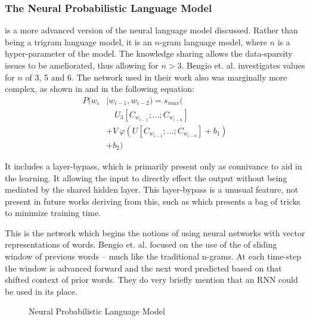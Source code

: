 \documentclass[parskip]{komatufte}
\begin{document}
\subsubsection{The Neural Probabilistic Language Model}
 is a more advanced version of the neural language model discussed.
Rather than being a trigram language model, it is an $n$-gram language model, where $n$ is a hyper-parameter of the model.
The knowledge sharing allows the data-sparsity issues to be ameliorated, thus allowing for $n>3$.
%
%
Bengio et. al. investigates values for $n$ of 3, 5 and 6.
The network used in their work also was marginally more complex, as shown in  and in the following equation:
\begin{align}
P(w_i & \mid w_{i-1}, w_{i-2}) = s_{max}( \nonumber
\\  & \quad U_3 \left[ C_{w_{i-1}};...; C_{w_{i-n}}\right] \nonumber
\\  & + V \: \varphi\left( U\left[C_{w_{i-1}};...; C_{w_{i-n}} \right] + b_1\right) \nonumber
\\  & +b_2)
\end{align}

It includes a layer-bypass, which is primarily present only as connivance to aid in the learning.
It allowing the input to directly effect the output without being mediated by the shared hidden layer.
This layer-bypass is a unusual feature, not present in future works deriving from this, such as  which presents a bag of tricks to minimize training time. 


This is the network which begins the notions of using neural networks with vector representations of words.
Bengio et. al. focused on the use of the of sliding window of previous words -- much like the traditional n-grams.
At each time-step the window is advanced forward and the next word predicted based on that shifted context of prior words.
They do very briefly mention that an RNN could be used in its place.

\begin{figure}
	\centering
	 
	\caption{\label{fig:neural-language-model} Neural Probabilistic Language Model}
\end{figure}
\end{document}
